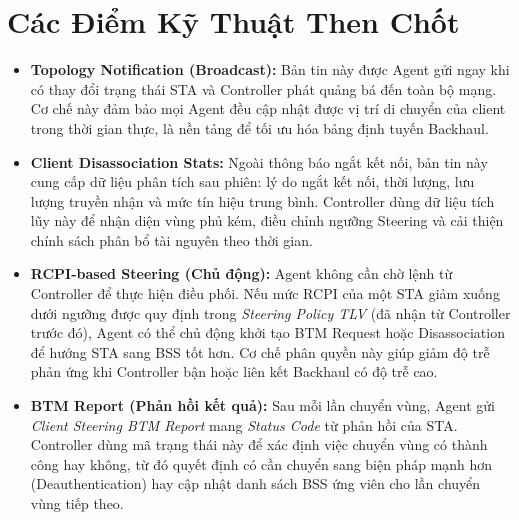 \section{Các Điểm Kỹ Thuật Then Chốt}

\begin{itemize}
	\item \textbf{Topology Notification (Broadcast):} Bản tin này được Agent gửi ngay
	khi có thay đổi trạng thái STA và Controller phát quảng bá đến toàn bộ mạng.
	Cơ chế này đảm bảo mọi Agent đều cập nhật được vị trí di chuyển của client
	trong thời gian thực, là nền tảng để tối ưu hóa bảng định tuyến Backhaul.
	
	\item \textbf{Client Disassociation Stats:} Ngoài thông báo ngắt kết nối, bản tin
	này cung cấp dữ liệu phân tích sau phiên: lý do ngắt kết nối, thời lượng,
	lưu lượng truyền nhận và mức tín hiệu trung bình. Controller dùng dữ liệu
	tích lũy này để nhận diện vùng phủ kém, điều chỉnh ngưỡng Steering và cải
	thiện chính sách phân bổ tài nguyên theo thời gian.
	
	\item \textbf{RCPI-based Steering (Chủ động):} Agent không cần chờ lệnh từ
	Controller để thực hiện điều phối. Nếu mức RCPI của một STA giảm xuống dưới
	ngưỡng được quy định trong \textit{Steering Policy TLV} (đã nhận từ Controller
	trước đó), Agent có thể chủ động khởi tạo BTM Request hoặc Disassociation để
	hướng STA sang BSS tốt hơn. Cơ chế phân quyền này giúp giảm độ trễ phản ứng
	khi Controller bận hoặc liên kết Backhaul có độ trễ cao.
	
	\item \textbf{BTM Report (Phản hồi kết quả):} Sau mỗi lần chuyển vùng, Agent gửi
	\textit{Client Steering BTM Report} mang \textit{Status Code} từ phản hồi của
	STA. Controller dùng mã trạng thái này để xác định việc chuyển vùng có thành
	công hay không, từ đó quyết định có cần chuyển sang biện pháp mạnh hơn
	(Deauthentication) hay cập nhật danh sách BSS ứng viên cho lần chuyển vùng tiếp
	theo.
\end{itemize}